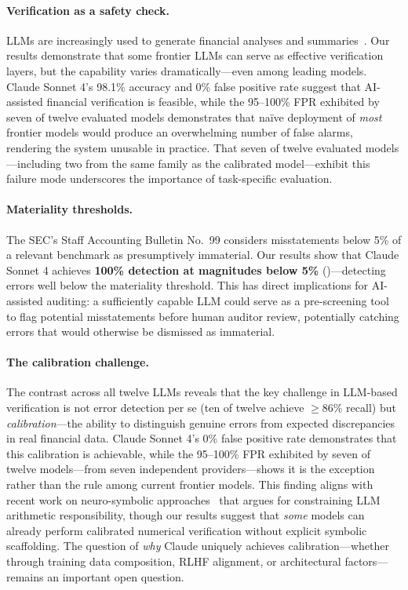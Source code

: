 \documentclass[11pt]{article}
\begin{document}
\paragraph{Verification as a safety check.}
LLMs are increasingly used to generate financial analyses and summaries~\citep{lin2026openfinllm}.
Our results demonstrate that some frontier LLMs can serve as effective verification layers, but the capability varies dramatically---even among leading models.
Claude Sonnet 4's 98.1\% accuracy and 0\% false positive rate suggest that AI-assisted financial verification is feasible, while the 95--100\% FPR exhibited by seven of twelve evaluated models demonstrates that na\"ive deployment of \emph{most} frontier models would produce an overwhelming number of false alarms, rendering the system unusable in practice.
That seven of twelve evaluated models---including two from the same family as the calibrated model---exhibit this failure mode underscores the importance of task-specific evaluation.

\paragraph{Materiality thresholds.}
The SEC's Staff Accounting Bulletin No.\ 99 considers misstatements below 5\% of a relevant benchmark as presumptively immaterial.
Our results show that Claude Sonnet 4 achieves \textbf{100\% detection at magnitudes below 5\%} ()---detecting errors well below the materiality threshold.
This has direct implications for AI-assisted auditing: a sufficiently capable LLM could serve as a pre-screening tool to flag potential misstatements before human auditor review, potentially catching errors that would otherwise be dismissed as immaterial.

\paragraph{The calibration challenge.}
The contrast across all twelve LLMs reveals that the key challenge in LLM-based verification is not error detection per se (ten of twelve achieve $\geq$86\% recall) but \emph{calibration}---the ability to distinguish genuine errors from expected discrepancies in real financial data.
Claude Sonnet 4's 0\% false positive rate demonstrates that this calibration is achievable, while the 95--100\% FPR exhibited by seven of twelve models---from seven independent providers---shows it is the exception rather than the rule among current frontier models.
This finding aligns with recent work on neuro-symbolic approaches~\citep{venra2026} that argues for constraining LLM arithmetic responsibility, though our results suggest that \emph{some} models can already perform calibrated numerical verification without explicit symbolic scaffolding.
The question of \emph{why} Claude uniquely achieves calibration---whether through training data composition, RLHF alignment, or architectural factors---remains an important open question.
\end{document}

